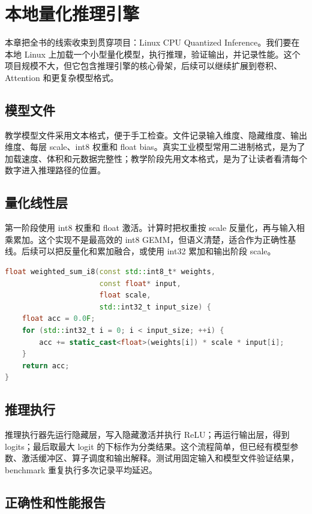 \chapter{本地量化推理引擎}

本章把全书的线索收束到贯穿项目：Linux CPU Quantized Inference。我们要在本地 Linux 上加载一个小型量化模型，执行推理，验证输出，并记录性能。这个项目规模不大，但它包含推理引擎的核心骨架，后续可以继续扩展到卷积、Attention 和更复杂模型格式。

\section{模型文件}

教学模型文件采用文本格式，便于手工检查。文件记录输入维度、隐藏维度、输出维度、每层 scale、int8 权重和 float bias。真实工业模型常用二进制格式，是为了加载速度、体积和元数据完整性；教学阶段先用文本格式，是为了让读者看清每个数字进入推理路径的位置。

\section{量化线性层}

第一阶段使用 int8 权重和 float 激活。计算时把权重按 scale 反量化，再与输入相乘累加。这个实现不是最高效的 int8 GEMM，但语义清楚，适合作为正确性基线。后续可以把反量化和累加融合，或使用 int32 累加和输出阶段 scale。

\begin{lstlisting}[language=C++,caption={量化线性层的第一阶段语义}]
float weighted_sum_i8(const std::int8_t* weights,
                      const float* input,
                      float scale,
                      std::int32_t input_size) {
    float acc = 0.0F;
    for (std::int32_t i = 0; i < input_size; ++i) {
        acc += static_cast<float>(weights[i]) * scale * input[i];
    }
    return acc;
}
\end{lstlisting}

\section{推理执行}

推理执行器先运行隐藏层，写入隐藏激活并执行 ReLU；再运行输出层，得到 logits；最后取最大 logit 的下标作为分类结果。这个流程简单，但已经有模型参数、激活缓冲区、算子调度和输出解释。测试用固定输入和模型文件验证结果，benchmark 重复执行多次记录平均延迟。

\section{正确性和性能报告}

